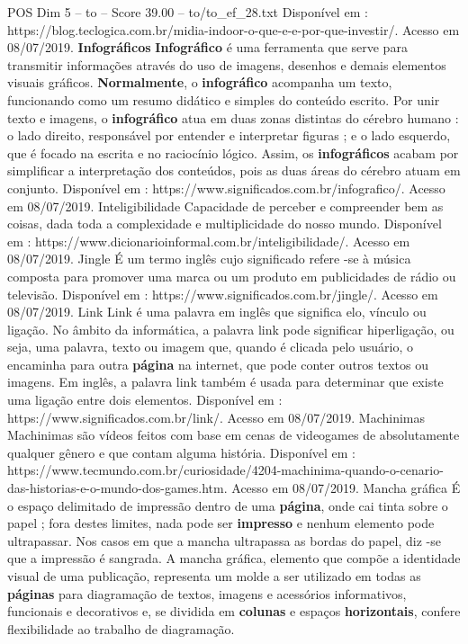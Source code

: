 \begin{textsample}{POS Dim 5 – to – Score 39.00 – to/to\_ef\_28.txt}
Disponível em : https://blog.teclogica.com.br/midia-indoor-o-que-e-e-por-que-investir/.
Acesso em 08/07/2019. \textbf{Infográficos} \textbf{Infográfico} é uma ferramenta que serve para transmitir informações através do uso de imagens, desenhos e demais elementos visuais gráficos. \textbf{Normalmente}, o \textbf{infográfico} acompanha um texto, funcionando como um resumo didático e simples do conteúdo escrito.
Por unir texto e imagens, o \textbf{infográfico} atua em duas zonas distintas do cérebro humano : o lado direito, responsável por entender e interpretar figuras ; e o lado esquerdo, que é focado na escrita e no raciocínio lógico.
Assim, os \textbf{infográficos} acabam por simplificar a interpretação dos conteúdos, pois as duas áreas do cérebro atuam em conjunto.
Disponível em : https://www.significados.com.br/infografico/.
Acesso em 08/07/2019.
Inteligibilidade Capacidade de perceber e compreender bem as coisas, dada toda a complexidade e multiplicidade do nosso mundo.
Disponível em : https://www.dicionarioinformal.com.br/inteligibilidade/.
Acesso em 08/07/2019.
Jingle É um termo inglês cujo significado refere -se à música composta para promover uma marca ou um produto em publicidades de rádio ou televisão.
Disponível em : https://www.significados.com.br/jingle/.
Acesso em 08/07/2019.
Link Link é uma palavra em inglês que significa elo, vínculo ou ligação.
No âmbito da informática, a palavra link pode significar hiperligação, ou seja, uma palavra, texto ou imagem que, quando é clicada pelo usuário, o encaminha para outra \textbf{página} na internet, que pode conter outros textos ou imagens.
Em inglês, a palavra link também é usada para determinar que existe uma ligação entre dois elementos.
Disponível em : https://www.significados.com.br/link/.
Acesso em 08/07/2019.
Machinimas Machinimas são vídeos feitos com base em cenas de videogames de absolutamente qualquer gênero e que contam alguma história.
Disponível em : https://www.tecmundo.com.br/curiosidade/4204-machinima-quando-o-cenario-das-historias-e-o-mundo-dos-games.htm.
Acesso em 08/07/2019.
Mancha gráfica É o espaço delimitado de impressão dentro de uma \textbf{página}, onde cai tinta sobre o papel ; fora destes limites, nada pode ser \textbf{impresso} e nenhum elemento pode ultrapassar.
Nos casos em que a mancha ultrapassa as bordas do papel, diz -se que a impressão é sangrada.
A mancha gráfica, elemento que compõe a identidade visual de uma publicação, representa um molde a ser utilizado em todas as \textbf{páginas} para diagramação de textos, imagens e acessórios informativos, funcionais e decorativos e, se dividida em \textbf{colunas} e espaços \textbf{horizontais}, confere flexibilidade ao trabalho de diagramação.

\end{textsample}
